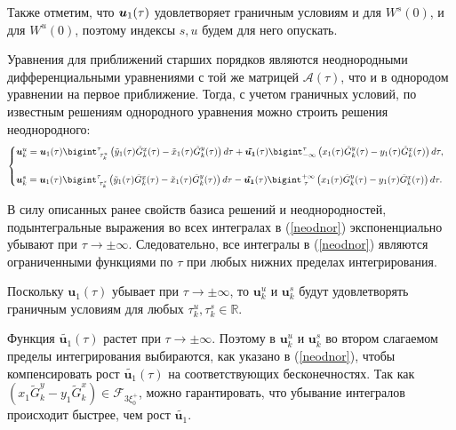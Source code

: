 Также отметим, что $\boldsymbol{u}_1(\tau)$ удовлетворяет граничным условиям и для $W^s(0)$, и для $W^u(0)$, поэтому индексы $s,u$ будем для него опускать. 

Уравнения для приближений старших порядков являются неоднородными дифференциальными уравнениями с той же матрицей $\mathcal{A}(\tau)$, что и в однородом уравнении на первое приближение. Тогда, с учетом граничных условий, по известным решениям однородного уравнения можно строить решения неоднородного:
\begin{equation}
    \begin{cases}
        \v u_k^u = 
        \v u_1(\tau)\bigint_{\text{ } \tau^u_k}^\tau \left( \tilde y_1(\tau) \tilde G_k^x(\tau) - \tilde x_1(\tau) \tilde G_k^y(\tau) \right) d \tau + 
        \v{ \tilde{u_1}}(\tau) \bigint_{-\infty}^\tau \left( x_1(\tau) \tilde G_k^y(\tau) - y_1(\tau) \tilde G_k^x(\tau) \right) d \tau,\\
        \\
        
        \v u_k^s = 
        \v u_1(\tau)\bigint_{\text{ } \tau^s_k}^{\tau} \left( \tilde y_1(\tau) \tilde G_k^x(\tau) - \tilde x_1(\tau) \tilde G_k^y(\tau) \right) d \tau - 
        \v{ \tilde{u_1}}(\tau) \bigint_{\text{ } \tau}^{+\infty} \left( x_1(\tau) \tilde G_k^y(\tau) - y_1(\tau) \tilde G_k^x(\tau) \right) d \tau. \\
    \end{cases}
    \label{neodnor}
\end{equation}

В силу описанных ранее свойств базиса решений и неоднородностей, подынтегральные выражения во всех интегралах в (\ref{neodnor}) экспоненциально убывают при $\tau \rightarrow \pm \infty$. Следовательно, все интегралы в (\ref{neodnor}) являются ограниченными функциями по $\tau$ при любых нижних пределах интегрирования.

Поскольку $\mathbf{u}_1(\tau)$ убывает при $\tau \rightarrow \pm \infty$, то $\mathbf{u}_k^u$ и $\mathbf{u}_k^s$ будут удовлетворять граничным условиям для любых $\tau^u_k, \tau^s_k \in \mathbb{R}$.

Функция $\tilde{\mathbf{u}_1}(\tau)$ растет при $\tau \rightarrow \pm \infty$. Поэтому в $\mathbf{u}_k^u$ и $\mathbf{u}_k^s$ во втором слагаемом пределы интегрирования выбираются, как указано в (\ref{neodnor}), чтобы компенсировать рост $\tilde{\mathbf{u}_1}(\tau)$ на соответствующих бесконечностях. Так как $(x_1 \tilde G_k^y - y_1 \tilde G_k^x) \in \mathcal{F}_{3\xi_0^+}$, можно гарантировать, что убывание интегралов происходит быстрее, чем рост $\tilde{\mathbf{u}_1}$.

